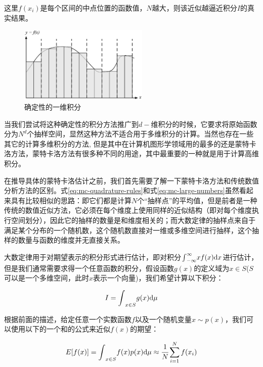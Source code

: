 \noindent 这里$f(x_i)$是每个区间的中点位置的函数值，$N$越大，则该近似越逼近积分$I$的真实结果。

\begin{figure}
\sidecaption
	\includegraphics[width=0.55\textwidth]{figures/mc/mc-finite-integration}
	\caption{确定性的一维积分}
	\label{f:mc-quadrature-rules}
\end{figure} 

当我们尝试将这种确定性的积分方法推广到$d-$维积分的时候，它要求将原始函数分为$N^d$个抽样空间，显然这种方法不适合用于多维积分的计算。当然也存在一些其它的计算多维积分的方法, 但是其中在计算机图形学领域用的最多的还是蒙特卡洛方法，蒙特卡洛方法有很多种不同的用途，其中最重要的一种就是用于计算高维积分。

在推导具体的蒙特卡洛估计之前，我们首先需要了解一下蒙特卡洛方法和传统数值分析方法的区别。式\ref{eq:mc-quadrature-rules}和式\ref{eq:mc-large-numbers}虽然看起来具有比较相似的思路：即它们都是计算$N$个“抽样点”的平均值，但是前者是一种传统的数值近似方法，它必须在每个维度上使用同样的近似结构（即对每个维度执行空间划分），因此它的抽样的数量是和维度相关的；而大数定律的抽样点来自于满足某个分布的一个随机数，这个随机数直接对一维或多维空间进行抽样，这个抽样的数量与函数的维度并无直接关系。

大数定律用于对期望表示的积分形式进行估计，即对积分${\rm \int}_{-\infty}^{\infty}xf(x){\rm d}x$进行估计，但是我们通常需要求得一个任意函数的积分，假设函数$g(x)$的定义域为$x\in S$($S$可以是一个多维空间，此时$x$表示一个向量)，我们希望计算以下积分：

\begin{equation}
	I={\rm \int}_{x\in S}g(x){\rm d}\mu
\end{equation}

根据前面的描述，给定任意一个实数函数$f$以及一个随机变量$x\sim p(x)$，我们可以使用以下的一个和的公式来近似$f(x)$的期望：

\begin{equation}\label{e:sum}
	E[f(x)]={\rm \int}_{x\in S}f(x)p(x){\rm d}\mu\approx \cfrac{1}{N}\sum_{i=1}^{N}f(x_i)
\end{equation}

